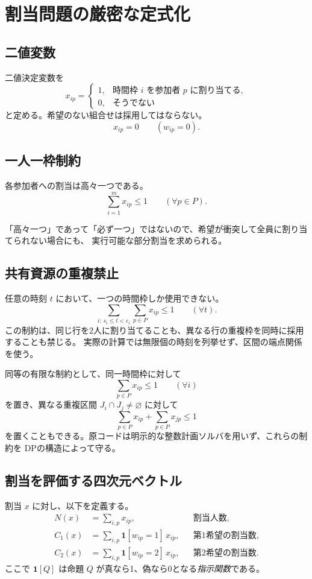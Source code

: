 \documentclass[11pt,a4paper]{ltjsarticle}
\theoremstyle{definition}
\theoremstyle{remark}
\newcommand{\ind}[1]{\mathbf{1}\!\left[#1\right]}
\begin{document}
\section{割当問題の厳密な定式化}
\subsection{二値変数}
二値決定変数を
\[
 x_{ip}=\begin{cases}
 1,&\text{時間枠 }i\text{ を参加者 }p\text{ に割り当てる},\\
 0,&\text{そうでない}
 \end{cases}
\]
と定める。希望のない組合せは採用してはならない。
\begin{equation}
 x_{ip}=0\qquad(w_{ip}=0).
 \label{eq:unrequested}
\end{equation}

\subsection{一人一枠制約}
各参加者への割当は高々一つである。
\begin{equation}
 \sum_{i=1}^{m}x_{ip}\leq1
 \qquad(\forall p\in P).
 \label{eq:person}
\end{equation}

「高々一つ」であって「必ず一つ」ではないので、希望が衝突して全員に割り当てられない場合にも、
実行可能な部分割当を求められる。

\subsection{共有資源の重複禁止}
任意の時刻 $t$ において、一つの時間枠しか使用できない。
\begin{equation}
 \sum_{i:\,s_i\leq t<e_i}\sum_{p\in P}x_{ip}\leq1
 \qquad(\forall t).
 \label{eq:resource}
\end{equation}
この制約は、同じ行を2人に割り当てることも、異なる行の重複枠を同時に採用することも禁じる。
実際の計算では無限個の時刻を列挙せず、区間の端点関係を使う。

同等の有限な制約として、同一時間枠に対して
\[
 \sum_{p\in P}x_{ip}\leq1\qquad(\forall i)
\]
を置き、異なる重複区間 $J_i\cap J_j\ne\varnothing$ に対して
\[
 \sum_{p\in P}x_{ip}+\sum_{p\in P}x_{jp}\leq1
\]
を置くこともできる。原コードは明示的な整数計画ソルバを用いず、これらの制約を
DPの構造によって守る。

\subsection{割当を評価する四次元ベクトル}
割当 $x$ に対し、以下を定義する。
\begin{align}
 N(x)&=\sum_{i,p}x_{ip}, &&\text{割当人数},\\
 C_1(x)&=\sum_{i,p}\ind{w_{ip}=1}\,x_{ip}, &&\text{第1希望の割当数},\\
 C_2(x)&=\sum_{i,p}\ind{w_{ip}=2}\,x_{ip}, &&\text{第2希望の割当数}.
\end{align}
ここで $\ind{Q}$ は命題 $Q$ が真なら1、偽なら0となる\emph{指示関数}である。
\end{document}
